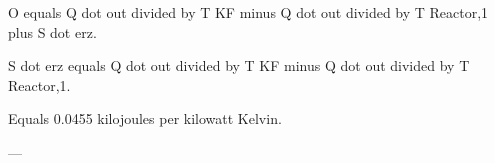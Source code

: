 O equals Q dot out divided by T KF minus Q dot out divided by T Reactor,1 plus S dot erz.  

S dot erz equals Q dot out divided by T KF minus Q dot out divided by T Reactor,1.  

Equals 0.0455 kilojoules per kilowatt Kelvin.  

---